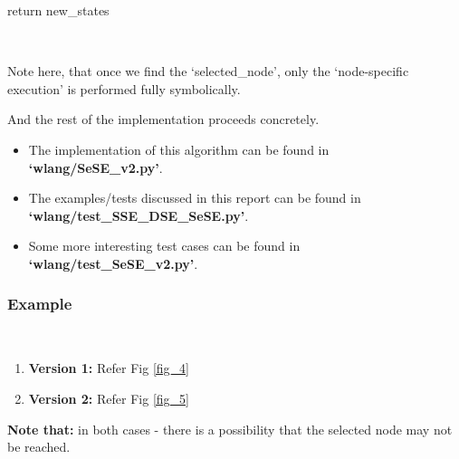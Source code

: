 \documentclass[11pt]{llncs}
\begin{document}
\begin{enumerate}
\begin{algorithm}[H]
{						      return new\_states
						}
					\end{algorithm}
					~\\

					\vspace{-3mm}

					Note here, that once we find the ‘selected\_node’, only the ‘node-specific execution’ is performed fully symbolically.

					And the rest of the implementation proceeds concretely.

					\vspace{-1mm}

					\begin{itemize}
						\item The implementation of this algorithm can be found in \textbf{‘wlang/SeSE\_v2.py’}.
						\item The examples/tests discussed in this report can be found in \textbf{‘wlang/test\_SSE\_DSE\_SeSE.py’}.
						\item Some more interesting test cases can be found in \textbf{‘wlang/test\_SeSE\_v2.py’}.
					\end{itemize}
			\end{enumerate}

		\vspace{-3mm}

		\subsubsection{Example}
			~\begin{enumerate}
				\item \textbf{Version 1:} Refer Fig \ref{fig_4}
				\item \textbf{Version 2:} Refer Fig \ref{fig_5}
			~\end{enumerate}

			\textbf{Note that:} in both cases - there is a possibility that the selected node may not be reached.
\end{document}
